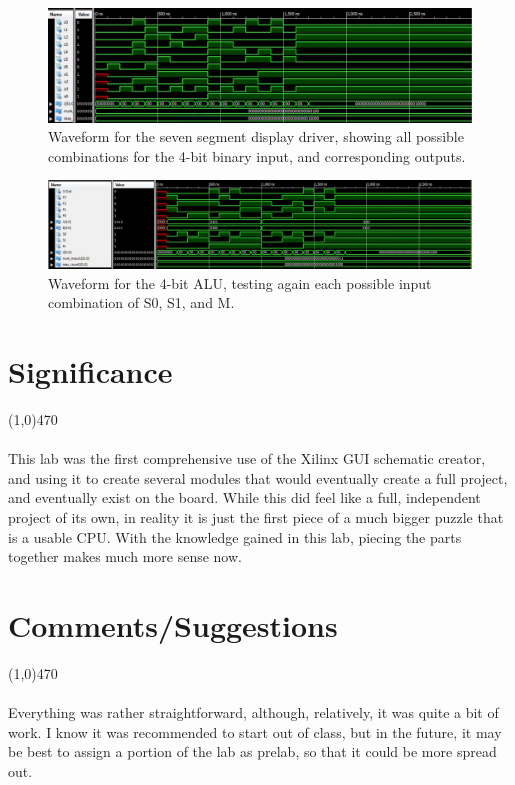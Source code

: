 \documentclass[12pt]{article}
\begin{document}
\begin{figure}[h!]
    \centering
	\includegraphics[scale=.2]{seven_segment_tb_wave.png}
	\caption{Waveform for the seven segment display driver, showing all possible combinations for the 4-bit binary input, and corresponding outputs.}
\end{figure}

\begin{figure}[h!]
    \centering
	\includegraphics[scale=.33]{alu4bit_tb_wave.png}
	\caption{Waveform for the 4-bit ALU, testing again each possible input combination of S0, S1, and M.}
\end{figure}

	
	\vspace{10cm}
\section{Significance} \vspace{-.7cm} \line(1,0){470}
	\paragraph{}
		This lab was the first comprehensive use of the Xilinx GUI schematic creator, and using it to create several modules that would eventually create a full project, and eventually exist on the board. While this did feel like a full, independent project of its own, in reality it is just the first piece of a much bigger puzzle that is a usable CPU. With the knowledge gained in this lab, piecing the parts together makes much more sense now. 

 \section{Comments/Suggestions}\vspace{-.7cm} \line(1,0){470}
 	\paragraph{}
		Everything was rather straightforward, although, relatively, it was quite a bit of work. I know it was recommended to start out of class, but in the future, it may be best to assign a portion of the lab as prelab, so that it could be more spread out.
		
\end{document}
